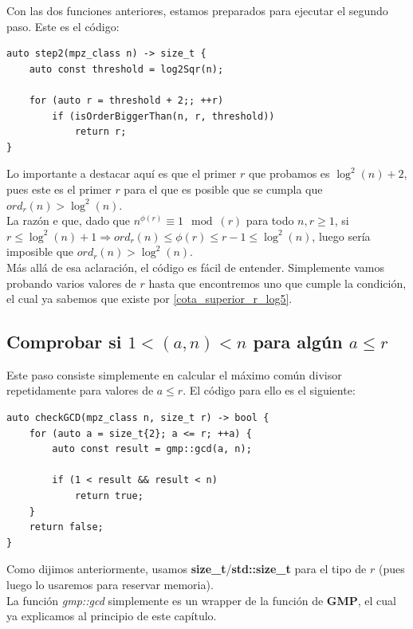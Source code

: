 Con las dos funciones anteriores, estamos preparados para ejecutar el segundo paso. Este es el código:\\

\begin{lstlisting}
auto step2(mpz_class n) -> size_t {
	auto const threshold = log2Sqr(n);
	
	for (auto r = threshold + 2;; ++r)
		if (isOrderBiggerThan(n, r, threshold))
			return r;
}
\end{lstlisting}

Lo importante a destacar aquí es que el primer $r$ que probamos es $\log^2(n) + 2$, pues este es el primer $r$ para el que es posible que se cumpla que $ord_r(n) > \log^2(n)$.\\

La razón e que, dado que $n^{\phi(r)} \equiv 1 \mod(r)$ para todo $n, r \geq 1$, si $r \leq \log^2(n) + 1 \Rightarrow ord_r(n) \leq \phi(r) \leq r - 1 \leq \log^2(n)$, luego sería imposible que $ord_r(n) > \log^2(n)$.\\

Más allá de esa aclaración, el código es fácil de entender. Simplemente vamos probando varios valores de $r$ hasta que encontremos uno que cumple la condición, el cual ya sabemos que existe por \autoref{cota_superior_r_log5}.

\subsection{Comprobar si $1 < (a, n) < n$ para algún $a \leq r$}

Este paso consiste simplemente en calcular el máximo común divisor repetidamente para valores de $a \leq r$. El código para ello es el siguiente:\\

\begin{lstlisting}
auto checkGCD(mpz_class n, size_t r) -> bool {
	for (auto a = size_t{2}; a <= r; ++a) {
		auto const result = gmp::gcd(a, n);
	
		if (1 < result && result < n)
			return true;
	}
	return false;
}
\end{lstlisting}

Como dijimos anteriormente, usamos \textbf{size\_t}/\textbf{std::size\_t} para el tipo de $r$ (pues luego lo usaremos para reservar memoria).\\

La función \textit{gmp::gcd} simplemente es un wrapper de la función de \textbf{GMP}, el cual ya explicamos al principio de este capítulo.\\

